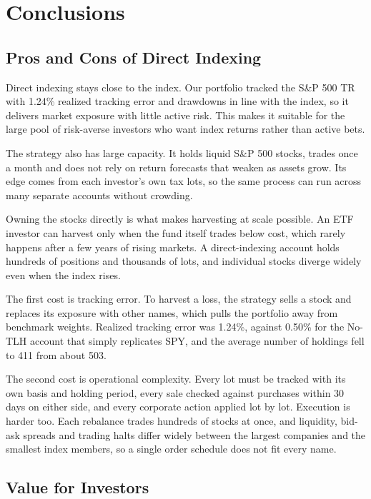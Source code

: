 \section{Conclusions}
\label{sec:conclusions}

\subsection{Pros and Cons of Direct Indexing}
\label{sec:proscons}

Direct indexing stays close to the index. Our portfolio tracked the S\&P 500 TR with 1.24\% realized tracking error and drawdowns in line with the index, so it delivers market exposure with little active risk. This makes it suitable for the large pool of risk-averse investors who want index returns rather than active bets.

The strategy also has large capacity. It holds liquid S\&P 500 stocks, trades once a month and does not rely on return forecasts that weaken as assets grow. Its edge comes from each investor's own tax lots, so the same process can run across many separate accounts without crowding.

Owning the stocks directly is what makes harvesting at scale possible. An ETF investor can harvest only when the fund itself trades below cost, which rarely happens after a few years of rising markets. A direct-indexing account holds hundreds of positions and thousands of lots, and individual stocks diverge widely even when the index rises.

The first cost is tracking error. To harvest a loss, the strategy sells a stock and replaces its exposure with other names, which pulls the portfolio away from benchmark weights. Realized tracking error was 1.24\%, against 0.50\% for the No-TLH account that simply replicates SPY, and the average number of holdings fell to 411 from about 503.

The second cost is operational complexity. Every lot must be tracked with its own basis and holding period, every sale checked against purchases within 30 days on either side, and every corporate action applied lot by lot. Execution is harder too. Each rebalance trades hundreds of stocks at once, and liquidity, bid-ask spreads and trading halts differ widely between the largest companies and the smallest index members, so a single order schedule does not fit every name.
\subsection{Value for Investors}
\label{sec:value}

